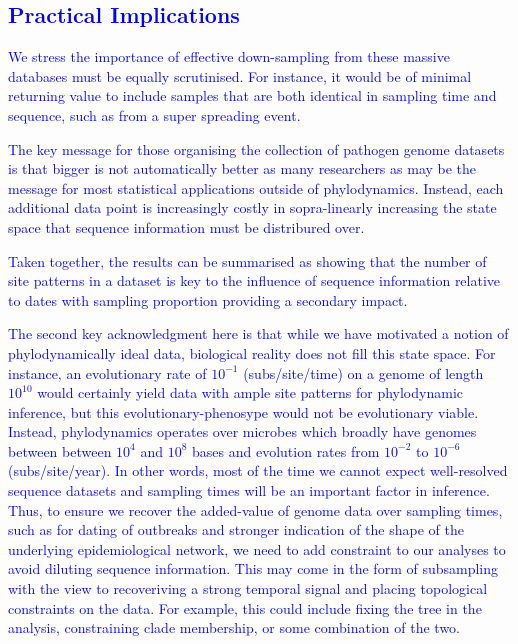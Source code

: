 \documentclass{article}
\begin{document}
\textcolor{blue}{\subsection{Practical Implications}}

\textcolor{blue}{We stress the importance of effective down-sampling from these massive databases must be equally scrutinised. For instance, it would be of minimal returning value to include samples that are both identical in sampling time and sequence, such as from a super spreading event.}

\textcolor{blue}{The key message for those organising the collection of pathogen genome datasets is that bigger is not automatically better as many researchers as may be the message for most statistical applications outside of phylodynamics. Instead, each additional data point is increasingly costly in sopra-linearly increasing the state space that sequence information must be distribured over.}

\textcolor{blue}{Taken together, the results can be summarised as showing that the number of site patterns in a dataset is key to the influence of sequence information relative to dates with sampling proportion providing a secondary impact.}

\textcolor{blue}{The second key acknowledgment here is that while we have motivated a notion of phylodynamically ideal data, biological reality does not fill this state space. For instance, an evolutionary rate of $10^{-1}$ (subs/site/time) on a genome of length $10^10$ would certainly yield data with ample site patterns for phylodynamic inference, but this evolutionary-phenosype would not be evolutionary viable. Instead, phylodynamics operates over microbes which broadly have genomes between between $10^4$ and $10^8$ bases and evolution rates from $10^{-2}$ to $10^{-6}$ (subs/site/year). In other words, most of the time we cannot expect well-resolved sequence datasets and sampling times will be an important factor in inference. Thus, to ensure we recover the added-value of genome data over sampling times, such as for dating of outbreaks and stronger indication of the shape of the underlying epidemiological network, we need to add constraint to our analyses to avoid diluting sequence information. This may come in the form of subsampling with the view to recoveriving a strong temporal signal and placing topological constraints on the data. For example, this could include fixing the tree in the analysis, constraining clade membership, or some combination of the two.}
\end{document}
